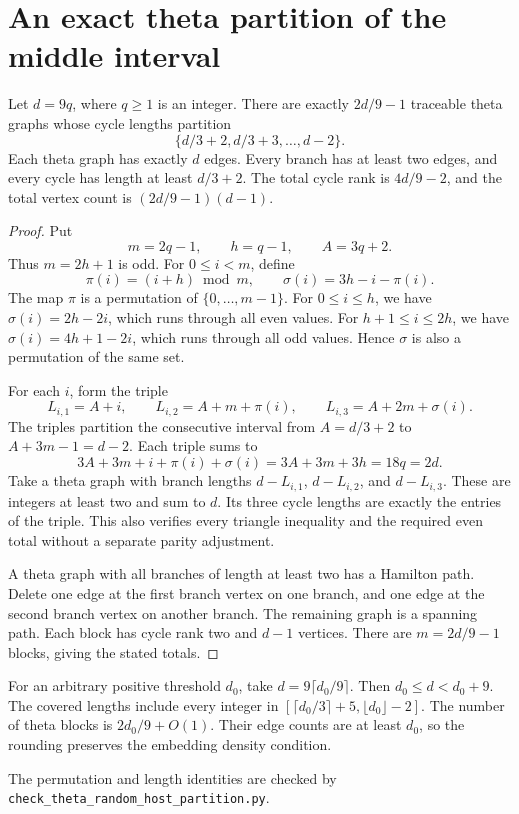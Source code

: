 \section{An exact theta partition of the middle interval}
\label{sec:rhost-theta-partition}

\begin{lemma}\label{lem:rhost-theta-middle}
Let $d=9q$, where $q\ge1$ is an integer.
There are exactly $2d/9-1$ traceable theta graphs whose cycle lengths partition
\[
 \{d/3+2,d/3+3,\ldots,d-2\}.
\]
Each theta graph has exactly $d$ edges.
Every branch has at least two edges, and every cycle has length at least $d/3+2$.
The total cycle rank is $4d/9-2$, and the total vertex count is $(2d/9-1)(d-1)$.
\end{lemma}

\begin{proof}
Put
\[
 m=2q-1,\qquad h=q-1,\qquad A=3q+2.
\]
Thus $m=2h+1$ is odd.
For $0\le i<m$, define
\[
 \pi(i)=(i+h)\bmod m,\qquad \sigma(i)=3h-i-\pi(i).
\]
The map $\pi$ is a permutation of $\{0,\ldots,m-1\}$.
For $0\le i\le h$, we have $\sigma(i)=2h-2i$, which runs through all even values.
For $h+1\le i\le2h$, we have $\sigma(i)=4h+1-2i$, which runs through all odd values.
Hence $\sigma$ is also a permutation of the same set.

For each $i$, form the triple
\[
 L_{i,1}=A+i,\qquad
 L_{i,2}=A+m+\pi(i),\qquad
 L_{i,3}=A+2m+\sigma(i).
\]
The triples partition the consecutive interval from $A=d/3+2$ to $A+3m-1=d-2$.
Each triple sums to
\[
 3A+3m+i+\pi(i)+\sigma(i)
 =3A+3m+3h=18q=2d.
\]
Take a theta graph with branch lengths $d-L_{i,1}$, $d-L_{i,2}$, and $d-L_{i,3}$.
These are integers at least two and sum to $d$.
Its three cycle lengths are exactly the entries of the triple.
This also verifies every triangle inequality and the required even total without a separate parity adjustment.

A theta graph with all branches of length at least two has a Hamilton path.
Delete one edge at the first branch vertex on one branch, and one edge at the second branch vertex on another branch.
The remaining graph is a spanning path.
Each block has cycle rank two and $d-1$ vertices.
There are $m=2d/9-1$ blocks, giving the stated totals.
\end{proof}

For an arbitrary positive threshold $d_0$, take $d=9\lceil d_0/9\rceil$.
Then $d_0\le d<d_0+9$.
The covered lengths include every integer in $[\lceil d_0/3\rceil+5,\lfloor d_0\rfloor-2]$.
The number of theta blocks is $2d_0/9+O(1)$.
Their edge counts are at least $d_0$, so the rounding preserves the embedding density condition.

The permutation and length identities are checked by
\nolinkurl{check_theta_random_host_partition.py}.
